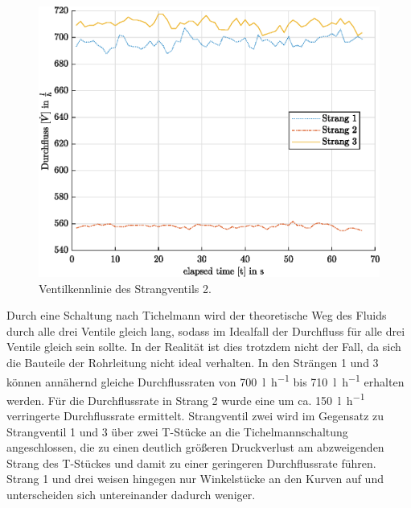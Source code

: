\begin{figure}[H]
	\centering
	\includegraphics[height=0.4\textheight]{../DATA/Tichel.eps}
	\caption[Ventilkennlinie des Strangventils 2]{Ventilkennlinie des Strangventils 2.}
	\label{fig:Tichel}
\end{figure}

Durch eine Schaltung nach Tichelmann wird der theoretische Weg des Fluids durch alle drei Ventile gleich lang, sodass im Idealfall der Durchfluss für alle drei Ventile gleich sein sollte. In der Realität ist dies trotzdem nicht der Fall, da sich die Bauteile der Rohrleitung nicht ideal verhalten. In den Strängen 1 und 3 können annähernd gleiche Durchflussraten von \SI{700}{\litre\per\hour} bis \SI{710}{\litre\per\hour} erhalten werden. Für die Durchflussrate in Strang 2 wurde eine um ca. \SI{150}{\litre\per\hour} verringerte Durchflussrate ermittelt. Strangventil zwei wird im Gegensatz zu Strangventil 1 und 3 über zwei T-Stücke an die Tichelmannschaltung angeschlossen, die zu einen deutlich größeren Druckverlust am abzweigenden Strang des T-Stückes und damit zu einer geringeren Durchflussrate führen. Strang 1 und drei weisen hingegen nur Winkelstücke an den Kurven auf und unterscheiden sich untereinander dadurch weniger.  